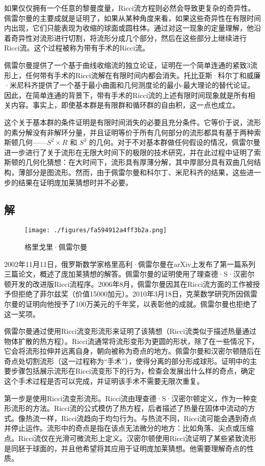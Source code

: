 如果仅仅拥有一个任意的黎曼度量，Ricci流方程则必然会导致更复杂的奇异性。佩雷尔曼的主要成就是证明了，如果从某种角度来看，如果这些奇异性在有限时间内出现，它们只能表现为收缩的球面或圆柱体。通过对这一现象的定量理解，他沿着奇异性对流形进行切割，将流形分成几个部分，然后在这些部分上继续进行Ricci流。这个过程被称为带有手术的Ricci流。

佩雷尔曼提供了一个基于曲线收缩流的独立论证，证明在一个简单连通的紧致3流形上，任何带有手术的Ricci流解在有限时间内都会消失。托比亚斯·科尔丁和威廉·米尼科齐提供了一个基于最小曲面和几何测度论的最小-最大理论的替代论证。因此，在简单连通的背景下，带有手术的Ricci流的上述有限时间现象就是所有相关内容。事实上，即使基本群是有限群和循环群的自由积，这一点也成立。

这个关于基本群的条件证明是有限时间消失的必要且充分条件。它等价于说，流形的素分解没有非解环分量，并且证明等价于所有几何部分的流形都具有基于两种索斯顿几何——\( S^2 \times R \) 和 \( S^3 \) 的几何。对于不对基本群做任何假设的情况，佩雷尔曼进一步进行了关于流形在无限大时间下的极限的技术研究，并在此过程中证明了索斯顿的几何化猜想：在大时间下，流形具有厚薄分解，其中厚部分具有双曲几何结构，薄部分是图流形。然而，由于佩雷尔曼和科尔丁、米尼科齐的结果，这些进一步的结果在证明庞加莱猜想时并不必要。
\subsection{解}
\begin{figure}[ht]
\centering
\texttt{[image: ./figures/fa594912a4ff3b2a.png]}
\caption{格里戈里·佩雷尔曼} \label{fig_PJLCX_3}
\end{figure}
2002年11月11日，俄罗斯数学家格里高利·佩雷尔曼在arXiv上发布了第一篇系列三篇论文，概述了庞加莱猜想的解答。佩雷尔曼的证明使用了理查德·S·汉密尔顿开发的改进版Ricci流程序。2006年8月，佩雷尔曼因其在Ricci流方面的工作被授予但拒绝了菲尔兹奖（价值15000加元）。2010年3月18日，克莱数学研究所因佩雷尔曼的证明向他授予了100万美元的千年奖，以表彰他的成就。佩雷尔曼也拒绝了这一奖项。

佩雷尔曼通过使用Ricci流变形流形来证明了该猜想（Ricci流类似于描述热量通过物体扩散的热方程）。Ricci流通常将流形变形为更圆的形状，除了在一些情况下，它会将流形拉伸并远离自身，朝向被称为奇点的地方。佩雷尔曼和汉密尔顿随后在奇点处切割流形（这一过程称为“手术”），使得分离的部分形成球形。证明中的主要步骤包括展示流形在Ricci流变形下的行为，检查会发展出什么样的奇点，确定这个手术过程是否可以完成，并证明该手术不需要无限次重复。

第一步是使用Ricci流变形流形。Ricci流由理查德·S·汉密尔顿定义，作为一种变形流形的方法。Ricci流的公式模仿了热方程，后者描述了热量在固体中流动的方式。像热流一样，Ricci流趋向于均匀行为。与热流不同，Ricci流可能会遇到奇点并停止运作。流形中的奇点是指在该点无法微分的地方：比如角落、尖点或压缩点。Ricci流仅在光滑可微流形上定义。汉密尔顿使用Ricci流证明了某些紧致流形是同胚于球面的，并且他希望将其应用于证明庞加莱猜想。他需要理解奇点的性质。

